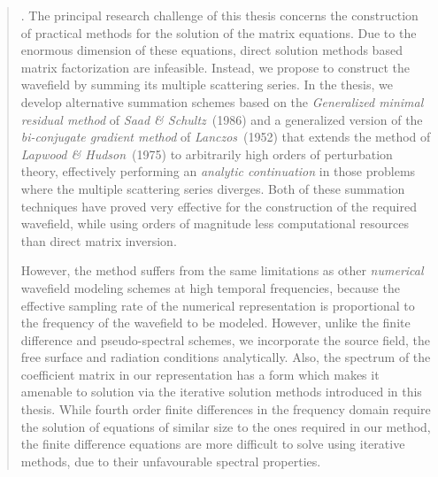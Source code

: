 \begin{samepage}
\begin{abstract}
. The principal research challenge of this thesis  
concerns the construction  of practical methods for the solution of the matrix equations. 
Due to the enormous dimension of these equations, direct solution methods based 
matrix factorization are infeasible. Instead, we propose to construct the wavefield by 
summing its multiple scattering series. In the thesis, we develop alternative summation schemes 
based on the {\em Generalized minimal residual method\/} of {\em Saad \& 
Schultz\/}~(1986) and a generalized version of the {\em bi-conjugate 
gradient method\/} of {\em Lanczos\/}~(1952)  that extends the method of 
{\em Lapwood \& Hudson\/}~(1975) to arbitrarily high orders of perturbation theory,
effectively performing an {\em analytic continuation\/}
in those problems where the multiple scattering series diverges.
Both of these summation techniques  
have proved very effective for the construction of the required wavefield, 
while using orders of magnitude less computational resources 
than direct matrix inversion. 

However, the method suffers from the same limitations as other {\em numerical\/} 
wavefield modeling schemes at high temporal frequencies, because the 
effective sampling rate of the numerical representation is proportional 
to the frequency of the wavefield to be modeled. However, unlike the  finite 
difference and pseudo-spectral schemes, we incorporate the source field, 
the free surface and radiation conditions analytically. Also, the spectrum of the 
coefficient matrix in our representation has a form which makes it amenable to solution 
via the iterative solution methods introduced in this thesis. While fourth order finite 
differences in the frequency domain require the solution of equations of similar size to 
the ones required in our method, the finite difference equations are more 
difficult to solve using iterative methods, due to their unfavourable spectral properties.



\end{abstract}
\end{samepage}


\tableofcontents



\bye
